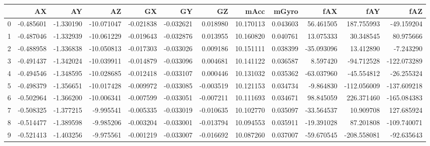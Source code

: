 \begin{tabular}{lrrrrrrrrrrr}
\toprule
{} &        AX &        AY &         AZ &        GX &        GY &        GZ &       mAcc &     mGyro &        fAX &         fAY &         fAZ \\
\midrule
0 & -0.485601 & -1.330190 & -10.071047 & -0.021838 & -0.032621 &  0.018980 &  10.170113 &  0.043603 &  56.461505 &  187.755993 &  -49.159204 \\
1 & -0.487046 & -1.332939 & -10.061229 & -0.019643 & -0.032876 &  0.013955 &  10.160820 &  0.040761 &  13.075333 &   30.348545 &   80.975666 \\
2 & -0.488958 & -1.336838 & -10.050813 & -0.017303 & -0.033026 &  0.009186 &  10.151111 &  0.038399 & -35.093096 &   13.412890 &   -7.243290 \\
3 & -0.491437 & -1.342024 & -10.039911 & -0.014879 & -0.033096 &  0.004681 &  10.141122 &  0.036587 &   8.597420 &  -94.712528 & -122.073289 \\
4 & -0.494546 & -1.348595 & -10.028685 & -0.012418 & -0.033107 &  0.000446 &  10.131032 &  0.035362 & -63.037960 &  -45.554812 &  -26.255324 \\
5 & -0.498379 & -1.356651 & -10.017428 & -0.009972 & -0.033085 & -0.003519 &  10.121153 &  0.034734 &  -9.864830 & -112.056009 & -137.609218 \\
6 & -0.502964 & -1.366200 & -10.006341 & -0.007599 & -0.033051 & -0.007211 &  10.111693 &  0.034671 &  98.845059 &  226.371460 & -165.084383 \\
7 & -0.508325 & -1.377215 &  -9.995541 & -0.005335 & -0.033019 & -0.010635 &  10.102770 &  0.035097 & -33.564537 &   10.909708 &  127.685924 \\
8 & -0.514477 & -1.389598 &  -9.985206 & -0.003204 & -0.033001 & -0.013794 &  10.094553 &  0.035911 & -19.391028 &   87.201808 & -109.740071 \\
9 & -0.521413 & -1.403256 &  -9.975561 & -0.001219 & -0.033007 & -0.016692 &  10.087260 &  0.037007 & -59.670545 & -208.558081 &  -92.635643 \\
\bottomrule
\end{tabular}

